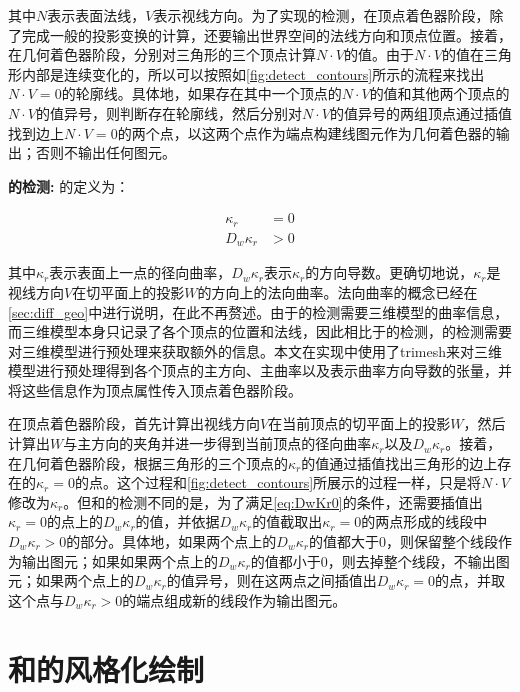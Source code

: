 其中$N$表示表面法线，$V$表示视线方向。为了实现\con{}的检测，在顶点着色器阶段，除了完成一般的投影变换的计算，还要输出世界空间的法线方向和顶点位置。接着，在几何着色器阶段，分别对三角形的三个顶点计算$N\cdot{V}$的值。由于$N\cdot{V}$的值在三角形内部是连续变化的，所以可以按照如\autoref{fig:detect_contours}所示的流程来找出$N\cdot{V} = 0$的轮廓线。具体地，如果存在其中一个顶点的$N\cdot{V}$的值和其他两个顶点的$N\cdot{V}$的值异号，则判断存在轮廓线，然后分别对$N\cdot{V}$的值异号的两组顶点通过插值找到边上$N\cdot{V} = 0$的两个点，以这两个点作为端点构建线图元作为几何着色器的输出；否则不输出任何图元。

\textbf{\scon{}的检测:} \scon{}的定义为：

\begin{align}
  \kappa_r &= 0 \label{eq:Kr0} \\
  D_w\kappa_r &> 0 \label{eq:DwKr0} 
\end{align}

其中$\kappa_r$表示表面上一点的径向曲率，$D_w\kappa_r$表示$\kappa_r$的方向导数。更确切地说，$\kappa_r$是视线方向$V$在切平面上的投影$W$的方向上的法向曲率。法向曲率的概念已经在\autoref{sec:diff_geo}中进行说明，在此不再赘述。由于\scon{}的检测需要三维模型的曲率信息，而三维模型本身只记录了各个顶点的位置和法线，因此相比于\con{}的检测，\scon{}的检测需要对三维模型进行预处理来获取额外的信息。本文在实现中使用了trimesh\cite{trimesh}来对三维模型进行预处理得到各个顶点的主方向、主曲率以及表示曲率方向导数的张量，并将这些信息作为顶点属性传入顶点着色器阶段。

在顶点着色器阶段，首先计算出视线方向$V$在当前顶点的切平面上的投影$W$，然后计算出$W$与主方向的夹角并进一步得到当前顶点的径向曲率$\kappa_r$以及$D_w\kappa_r$。接着，在几何着色器阶段，根据三角形的三个顶点的$\kappa_r$的值通过插值找出三角形的边上存在的$\kappa_r = 0$的点。这个过程和\autoref{fig:detect_contours}所展示的过程一样，只是将$N\cdot{V}$修改为$\kappa_r$。但和\con{}的检测不同的是，为了满足\autoref{eq:DwKr0}的条件，还需要插值出$\kappa_r = 0$的点上的$D_w\kappa_r$的值，并依据$D_w\kappa_r$的值截取出$\kappa_r = 0$的两点形成的线段中$D_w\kappa_r > 0$的部分。具体地，如果两个点上的$D_w\kappa_r$的值都大于0，则保留整个线段作为输出图元；如果如果两个点上的$D_w\kappa_r$的值都小于0，则去掉整个线段，不输出图元；如果两个点上的$D_w\kappa_r$的值异号，则在这两点之间插值出$D_w\kappa_r = 0$的点，并取这个点与$D_w\kappa_r > 0$的端点组成新的线段作为输出图元。

\section{\con{}和\scon{}的风格化绘制}

